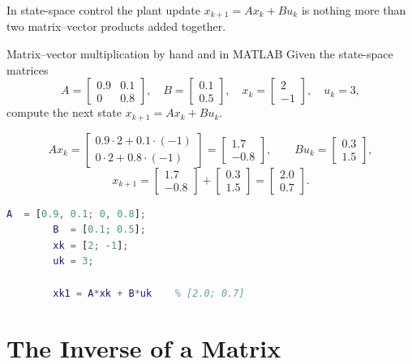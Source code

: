 In state-space control the plant update $x_{k+1} = Ax_k + Bu_k$ is
nothing more than two matrix--vector products added together.

\begin{examplebox}{Matrix--vector multiplication by hand and in MATLAB}
	Given the state-space matrices
	\[
	A = \begin{bmatrix} 0.9 & 0.1 \\ 0 & 0.8 \end{bmatrix},
	\quad
	B = \begin{bmatrix} 0.1 \\ 0.5 \end{bmatrix},
	\quad
	x_k = \begin{bmatrix} 2 \\ -1 \end{bmatrix},
	\quad
	u_k = 3,
	\]
	compute the next state $x_{k+1} = Ax_k + Bu_k$.
	
	\solution
	\[
	Ax_k =
	\begin{bmatrix} 0.9\cdot2 + 0.1\cdot(-1) \\ 0\cdot2 + 0.8\cdot(-1)
	\end{bmatrix}
	= \begin{bmatrix} 1.7 \\ -0.8 \end{bmatrix},
	\qquad
	Bu_k =
	\begin{bmatrix} 0.3 \\ 1.5 \end{bmatrix},
	\]
	\[
	x_{k+1} = \begin{bmatrix} 1.7 \\ -0.8 \end{bmatrix}
	+ \begin{bmatrix} 0.3 \\ 1.5 \end{bmatrix}
	= \begin{bmatrix} 2.0 \\ 0.7 \end{bmatrix}.
	\]
	
	\begin{lstlisting}[language=Matlab]
		A  = [0.9, 0.1; 0, 0.8];
		B  = [0.1; 0.5];
		xk = [2; -1];
		uk = 3;
		
		xk1 = A*xk + B*uk    % [2.0; 0.7]
	\end{lstlisting}
\end{examplebox}

\section{The Inverse of a Matrix}
\label{sec:app_inverse}

